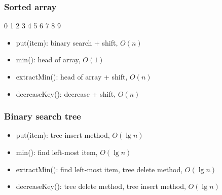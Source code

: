\documentclass{beamer}
\begin{document}
\begin{frame}
 \frametitle{Sorted array}
 \begin{center}
  0 1 2 3 4 5 6 7 8 9
 \end{center}
 \begin{itemize}
  \item put(item): binary search + shift, $O(n)$
  \item min(): head of array, $O(1)$
  \item extractMin(): head of array + shift, $O(n)$
  \item decreaseKey(): decrease + shift, $O(n)$
 \end{itemize}
\end{frame}

\begin{frame}
 \frametitle{Binary search tree}
 \begin{center}
  \scalebox{0.6} {
  }
 \end{center}
 \begin{itemize}
  \item put(item): tree insert method, $O(\lg n)$
  \item min(): find left-most item, $O(\lg n)$
  \item extractMin(): find left-most item, tree delete method, $O(\lg n)$
  \item decreaseKey(): tree delete method, tree insert method, $O(\lg n)$
 \end{itemize}
\end{frame}
\end{document}

